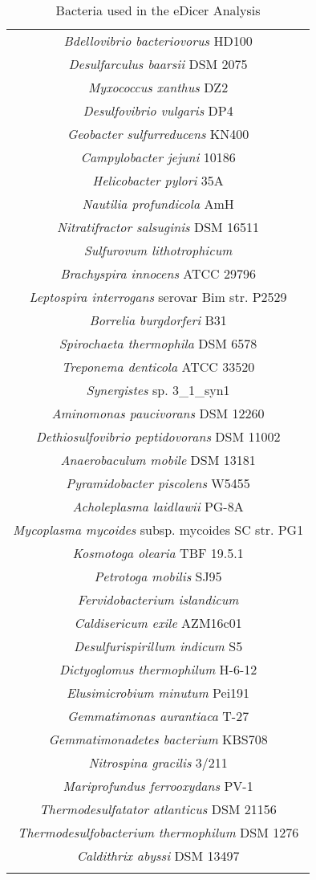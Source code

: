 \begin{center}
\begin{longtable}{|c|}
\textit{Bdellovibrio bacteriovorus} HD100\\
\textit{Desulfarculus baarsii} DSM 2075\\
\textit{Myxococcus xanthus} DZ2\\
\textit{Desulfovibrio vulgaris} DP4\\
\textit{Geobacter sulfurreducens} KN400\\
\textit{Campylobacter jejuni} 10186\\
\textit{Helicobacter pylori} 35A\\
\textit{Nautilia profundicola} AmH\\
\textit{Nitratifractor salsuginis} DSM 16511\\
\textit{Sulfurovum lithotrophicum}\\
\textit{Brachyspira innocens} ATCC 29796\\
\textit{Leptospira interrogans} serovar Bim str. P2529\\
\textit{Borrelia burgdorferi} B31\\
\textit{Spirochaeta thermophila} DSM 6578\\
\textit{Treponema denticola} ATCC 33520\\
\textit{Synergistes} sp. 3\_1\_syn1\\
\textit{Aminomonas paucivorans} DSM 12260\\
\textit{Dethiosulfovibrio peptidovorans} DSM 11002\\
\textit{Anaerobaculum mobile} DSM 13181\\
\textit{Pyramidobacter piscolens} W5455\\
\textit{Acholeplasma laidlawii} PG-8A\\
\textit{Mycoplasma mycoides} subsp. mycoides SC str. PG1\\
\textit{Kosmotoga olearia} TBF 19.5.1\\
\textit{Petrotoga mobilis} SJ95\\
\textit{Fervidobacterium islandicum}\\
\textit{Caldisericum exile} AZM16c01\\
\textit{Desulfurispirillum indicum} S5\\
\textit{Dictyoglomus thermophilum} H-6-12\\
\textit{Elusimicrobium minutum} Pei191\\
\textit{Gemmatimonas aurantiaca} T-27\\
\textit{Gemmatimonadetes bacterium} KBS708\\
\textit{Nitrospina gracilis} 3/211\\
\textit{Mariprofundus ferrooxydans} PV-1\\
\textit{Thermodesulfatator atlanticus} DSM 21156\\
\textit{Thermodesulfobacterium thermophilum} DSM 1276\\
\textit{Caldithrix abyssi} DSM 13497\\
\hline
\caption[Bacteria Used for eDicer Analysis]{Bacteria used in 
the eDicer Analysis}
\label{tab:edicer_genome_bacteria}

\end{longtable}
\end{center}


